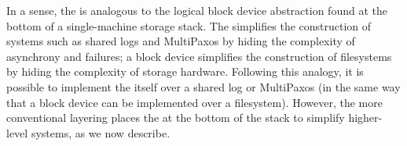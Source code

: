 In a sense, the \WOR{} is analogous to the logical block device abstraction found at the bottom of a single-machine storage stack. The \WOR{} simplifies the construction of systems such as shared logs and MultiPaxos by hiding the complexity of asynchrony and failures; a block device simplifies the construction of filesystems by hiding the complexity of storage hardware. Following this analogy, it is possible to implement the \WOR{} itself over a shared log or MultiPaxos (in the same way that a block device can be implemented over a filesystem). However, the more conventional layering places the \WOR{} at the bottom of the stack to simplify higher-level systems, as we now describe. 



